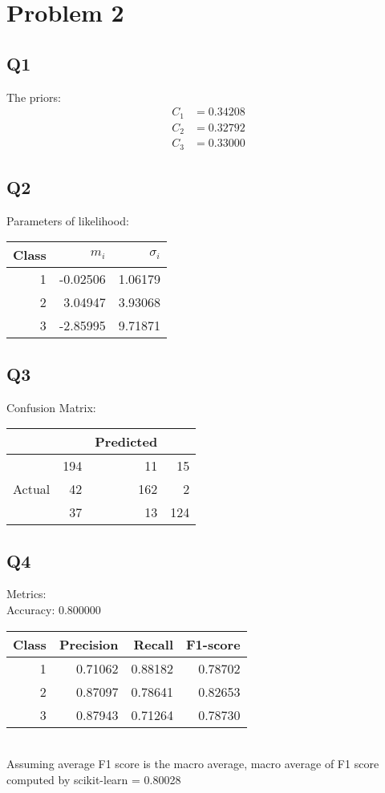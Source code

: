 \documentclass{subfiles}
\begin{document}
  \section{Problem 2}
  \subsection{Q1}
  The priors:
  \begin{equation*}
    \begin{split}
      C_1 &= 0.34208\\
      C_2 &= 0.32792\\
      C_3 &= 0.33000
    \end{split}
  \end{equation*}\cite{2020SciPy-NMeth}
  \subsection{Q2}
  Parameters of likelihood:
  \begin{tabular}{|r|r|r|}
    \hline
    Class & \(m_i\) & \(\sigma_i\)\\
    \hline
    1 & -0.02506 & 1.06179\\
    \hline
    2 & 3.04947 & 3.93068\\
    \hline
    3 & -2.85995 & 9.71871\\
    \hline
  \end{tabular}\cite{2020SciPy-NMeth}
  \subsection{Q3}
  Confusion Matrix:
  \begin{tabular}{|r|r|r|r|}
    \hline
    & & Predicted & \\
    \hline
    & 194 & 11 & 15\\
    \hline
    Actual & 42 & 162 & 2\\
    \hline
    & 37 & 13 & 124\\
    \hline
  \end{tabular}\cite{scikit-learn}
  \subsection{Q4}
  Metrics:\\
  Accuracy: 0.800000\cite{scikit-learn}\\
  \begin{tabular}{|r|r|r|r|}
    \hline
    Class & Precision & Recall & F1-score\\
    \hline
    1 & 0.71062 & 0.88182 & 0.78702\\
    \hline
    2 & 0.87097 & 0.78641 & 0.82653\\
    \hline
    3 & 0.87943 & 0.71264 & 0.78730\\
    \hline
  \end{tabular}\cite{scikit-learn}\\
  Assuming average F1 score is the macro average, macro average of F1 score computed by scikit-learn = 0.80028\cite{scikit-learn}
\end{document}
